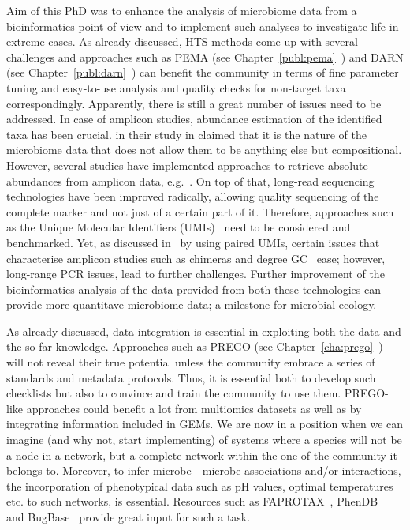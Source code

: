   Aim of this PhD was to enhance the analysis of microbiome data from a bioinformatics-point of view
   and to implement such analyses to investigate life in extreme cases. 
   As already discussed, HTS methods come up with several challenges and 
   approaches such as PEMA (see Chapter~\ref{publ:pema}~\citep{zafeiropoulos2020pema}) and 
   DARN (see Chapter~\ref{publ:darn}~\citep{zafeiropoulos2021dark}) can benefit the community 
   in terms of fine parameter tuning and easy-to-use analysis and 
   quality checks for non-target taxa correspondingly. 
   Apparently, there is still a great number of issues need to be addressed.
   In case of amplicon studies, abundance estimation of the identified taxa has been crucial.
   \citeauthor{gloor2017microbiome} in their study in \citeyear{gloor2017microbiome} 
   claimed that it is the nature of the microbiome data that does not allow them to be anything else but compositional. 
   However, several studies have implemented approaches to retrieve 
   absolute abundances from amplicon data, e.g.~\citep{kim2021measuring, zemb2020absolute}.
   On top of that, long-read sequencing technologies have been improved radically, 
   allowing quality sequencing of the complete marker and not just of a certain part of it. 
   Therefore, approaches such as the Unique Molecular Identifiers (UMIs)~\citep{hiatt2010parallel} 
   need to be considered and benchmarked. 
   Yet, as discussed in~\citep{karst2021high}  
   by using paired UMIs, certain issues that characterise amplicon studies 
   such as chimeras and degree GC~\citep{benita2003regionalized} ease; 
   however, long-range PCR issues, 
   lead to further challenges. 
   Further improvement of the bioinformatics analysis of the data provided from both these technologies
   can provide more quantitave microbiome data; a milestone for microbial ecology. 

   As already discussed, data integration is essential in 
   exploiting both the data and the so-far knowledge. 
   Approaches such as PREGO (see Chapter~\ref{cha:prego}~\citep{zafeiropoulos_prego_2022}) 
   will not reveal their true potential unless the community embrace a series of standards and 
   metadata protocols. 
   Thus, it is essential both to develop such checklists 
   but also to convince and train the community to use them. 
   PREGO-like approaches could benefit a lot from multiomics datasets 
   as well as by integrating information included in GEMs.
   We are now in a position when we can imagine (and why not, start implementing)
   of systems where a species will not be a node in a network, 
   but a complete network within the one of the community it belongs to.
   Moreover, to infer microbe - microbe associations and/or interactions,
   the incorporation of phenotypical data 
   such as pH values, optimal temperatures etc. to such networks, 
   is essential. 
   Resources such as FAPROTAX~\citep*{louca2016decoupling}, PhenDB~\citep{feldbauer2015prediction}
   and BugBase~\citep{Ward133462} provide great input for such a task. 

